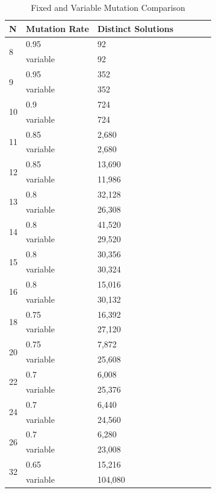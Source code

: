 \documentclass[conference]{IEEEtran}
\begin{document}
\begin{table}
\centering
\caption{Fixed and Variable Mutation Comparison}
\begin{tabular}{|l|l|l|l|l|l|l|} \hline
N&               Mutation Rate&  Distinct Solutions\\ \hline
\multirow{2}{*}{8}&   0.95&           92\\
&                     variable&       92\\ \hline
\multirow{2}{*}{9}&   0.95&           352\\
&                     variable&       352\\ \hline
\multirow{2}{*}{10}&  0.9&            724\\
&                     variable&       724\\ \hline
\multirow{2}{*}{11}&  0.85&           2,680\\
&                     variable&       2,680\\ \hline
\multirow{2}{*}{12}&  0.85&           13,690\\
&                     variable&       11,986\\ \hline
\multirow{2}{*}{13}&  0.8&            32,128\\
&                     variable&       26,308\\ \hline
\multirow{2}{*}{14}&  0.8&            41,520\\
&                     variable&       29,520\\ \hline
\multirow{2}{*}{15}&  0.8&            30,356\\
&                     variable&       30,324\\ \hline
\multirow{2}{*}{16}&  0.8&            15,016\\
&                     variable&       30,132\\ \hline
\multirow{2}{*}{18}&  0.75&           16,392\\
&                     variable&       27,120\\ \hline
\multirow{2}{*}{20}&  0.75&           7,872\\
&                     variable&       25,608\\ \hline
\multirow{2}{*}{22}&  0.7&            6,008\\
&                     variable&       25,376\\ \hline
\multirow{2}{*}{24}&  0.7&            6,440\\
&                     variable&       24,560\\ \hline
\multirow{2}{*}{26}&  0.7&            6,280\\
&                     variable&       23,008\\ \hline
\multirow{2}{*}{32}&  0.65&           15,216\\
&                     variable&       104,080\\
\hline\end{tabular}
\label{table:bestsol}
\end{table}
\end{document}
